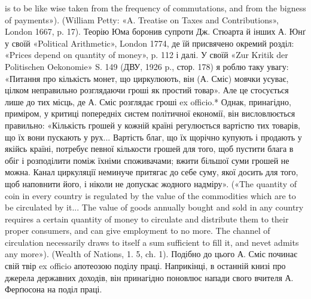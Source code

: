 is to be like wise taken from the frequency of commutations, and from
the bigness of payments»). (William Petty: «A. Treatise on Taxes and
Contributions», London 1667, p. 17). Теорію Юма боронив супроти
Дж. Стюарта й інших А. Юнґ у своїй «Political Arithmetic», London
1774, де їй присвячено окремий розділ: «Prices depend on quantity of
money», p. 112 і далі. У своїй «Zur Kritik der Politischen Oekonomie»
S. 149 (ДВУ, 1926 p., стор. 178) я роблю таку увагу: «Питання про кількість
монет, що циркулюють, він (А. Сміс) мовчки усуває, цілком неправильно
розглядаючи гроші як простий товар». Але це стосується лише
до тих місць, де А. Сміс розглядає гроші ex officio.* Однак, принагідно,
приміром, у критиці попередніх систем політичної економії, він висловлюється
правильно: «Кількість грошей у кожній країні регулюється вартістю
тих товарів, що їх вони пускають у рух... Вартість благ, що їх щорічно
купують і продають у якійсь країні, потребує певної кількости грошей
для того, щоб пустити блага в обіг і розподілити поміж їхніми споживачами;
вжити більшої суми грошей не можна. Канал циркуляції
неминуче притягає до себе суму, якої досить для того, щоб наповнити
його, і ніколи не допускає жодного надміру». («The quantity of coin in
every country is regulated by the value of the commodities which are to
be circulated by it... The value of goods annually bought and sold in any
country requires a certain quantity of money to circulate and distribute
them to their proper consumers, and can give employment to no more. The
channel of circulation necessarily draws to itself a sum sufficient to fill
it, and nevet admits any more»). (Wealth of Nations, 1. 5, ch. 1). Подібно
до цього А. Сміс починає свій твір ex officio апотеозою поділу праці. Наприкінці,
в останній книзі про джерела державних доходів, він принагідно
поновлює напади свого вчителя А. Ферґюсона на поділ праці.